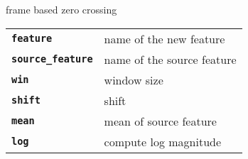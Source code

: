 \begin{description}
\begin{description}
        frame based zero crossing

      \begin{tabular}{ll}
 \texttt{\textbf{feature}} &         name of the new feature \\
 \texttt{\textbf{source\_feature}} &  name of the source feature \\
 \texttt{\textbf{win}} &             window size  \\
 \texttt{\textbf{shift}} &            shift  \\
 \texttt{\textbf{mean}} &             mean of source feature  \\
 \texttt{\textbf{log}} &              compute log magnitude  \\
      \end{tabular}
    \end{description}

\end{description}

